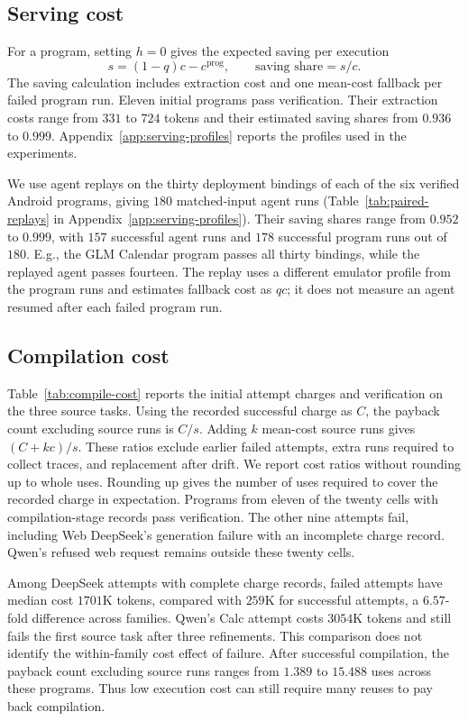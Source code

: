 \subsection{Serving cost}
\label{sec:share}

For a program, setting $h=0$ gives the expected saving per execution
\begin{equation}
s=(1-q)c-c^{\mathrm{prog}},\qquad\text{saving share}=s/c.
\label{eq:saving}
\end{equation}
The saving calculation includes extraction cost and one mean-cost fallback per failed program run.
Eleven initial programs pass verification.
Their extraction costs range from $331$ to $724$ tokens and their estimated saving shares from $0.936$ to $0.999$.
Appendix~\ref{app:serving-profiles} reports the profiles used in the experiments.

\label{sec:paired}
We use agent replays on the thirty deployment bindings of each of the six verified Android programs, giving $180$ matched-input agent runs (Table~\ref{tab:paired-replays} in Appendix~\ref{app:serving-profiles}).
Their saving shares range from $0.952$ to $0.999$, with $157$ successful agent runs and $178$ successful program runs out of $180$.
E.g., the GLM Calendar program passes all thirty bindings, while the replayed agent passes fourteen.
The replay uses a different emulator profile from the program runs and estimates fallback cost as $qc$; it does not measure an agent resumed after each failed program run.

\subsection{Compilation cost}
\label{sec:compile-cost}

Table~\ref{tab:compile-cost} reports the initial attempt charges and verification on the three source tasks.
Using the recorded successful charge as $C$, the payback count excluding source runs is $C/s$.
Adding $k$ mean-cost source runs gives $(C+kc)/s$.
These ratios exclude earlier failed attempts, extra runs required to collect traces, and replacement after drift.
We report cost ratios without rounding up to whole uses.
Rounding up gives the number of uses required to cover the recorded charge in expectation.
Programs from eleven of the twenty cells with compilation-stage records pass verification.
The other nine attempts fail, including Web DeepSeek's generation failure with an incomplete charge record.
Qwen's refused web request remains outside these twenty cells.



Among DeepSeek attempts with complete charge records, failed attempts have median cost $1701$K tokens, compared with $259$K for successful attempts, a $6.57$-fold difference across families.
Qwen's Calc attempt costs $3054$K tokens and still fails the first source task after three refinements.
This comparison does not identify the within-family cost effect of failure.
After successful compilation, the payback count excluding source runs ranges from $1.389$ to $15.488$ uses across these programs.
Thus low execution cost can still require many reuses to pay back compilation.
